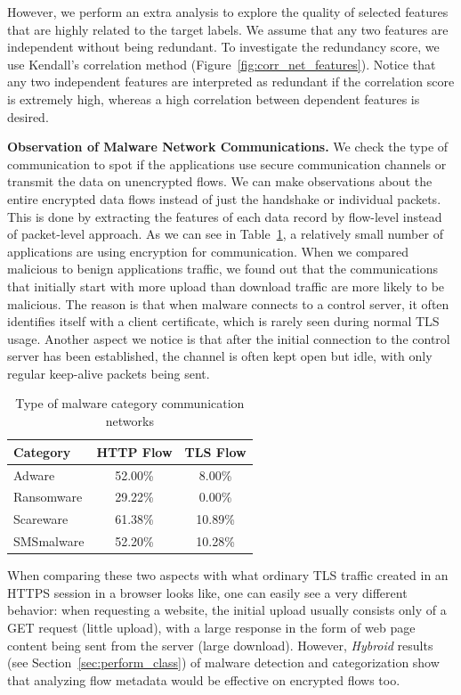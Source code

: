 \documentclass[runningheads]{llncs}
\newcommand{\toolname}{\textit{Hybroid}\xspace}
\begin{document}
However, we perform an extra analysis to explore the quality of selected features that are highly related to the target labels. We assume that any two features are independent without being redundant. To investigate the redundancy score, we use Kendall’s correlation method (Figure~\ref{fig:corr_net_features}). Notice that any two independent features are interpreted as redundant if the correlation score is extremely high, whereas a high correlation between dependent features is desired.

\medskip \noindent \textbf{Observation of Malware Network Communications.}
We check the type of communication to spot if the applications use secure communication channels or transmit the data on unencrypted flows. We can make observations about the entire encrypted data flows instead of just the handshake or individual packets. This is done by extracting the features of each data record by flow-level instead of packet-level approach. As we can see in Table~\ref{tab:mal_comm}, a relatively small number of applications are using encryption for communication. When we compared malicious to benign applications traffic, we found out that the communications that initially start with more upload than download traffic are more likely to be malicious. The reason is that when malware connects to a control server, it often identifies itself with a client certificate, which is rarely seen during normal TLS usage. Another aspect we notice is that after the initial connection to the control server has been established, the channel is often kept open but idle, with only regular keep-alive packets being sent.

\begin{table}[t]
\caption{Type of malware category communication networks }
\label{tab:mal_comm}
\centering
\begin{tabular}{lcc}
\toprule
\bfseries Category &  \bfseries HTTP Flow &  \bfseries TLS Flow\\
\midrule
Adware & 52.00\% & 8.00\%\\
Ransomware & 29.22\% & 0.00\%\\
Scareware & 61.38\% & 10.89\%\\
SMSmalware & 52.20\% & 10.28\%\\
\bottomrule
\end{tabular}
\end{table}

When comparing these two aspects with what ordinary TLS traffic created in an HTTPS session in a browser looks like, one can easily see a very different behavior: when requesting a website, the initial upload usually consists only of a GET request (little upload), with a large response in the form of web page content being sent from the server (large download). However, \toolname results (see Section~\ref{sec:perform_class}) of malware detection and categorization show that analyzing flow metadata would be effective on encrypted flows too.
\end{document}
